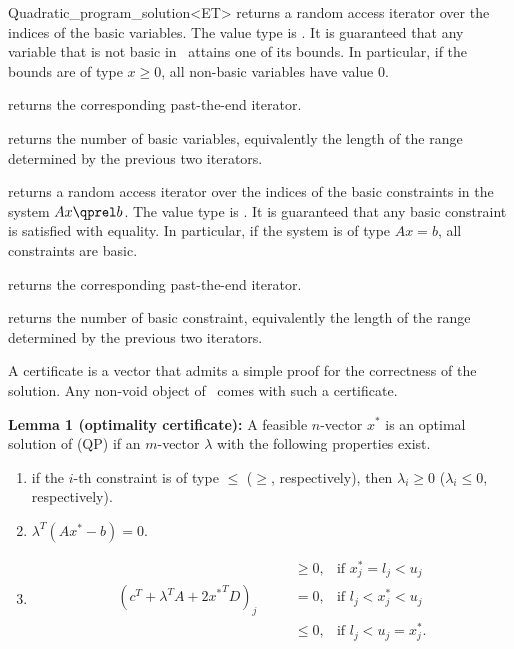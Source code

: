 \begin{ccRefClass}{Quadratic_program_solution<ET>}
{returns a random access iterator over the indices of the basic
variables. The value type is . It is guaranteed that any 
variable that is not basic in \ccVar\ attains one of its bounds. 
In particular, if the bounds are of type $x\geq 0$, all non-basic 
variables have value $0$.}

{returns the corresponding past-the-end iterator.}

{returns the number of basic variables, equivalently the length
of the range determined by the previous two iterators.}

\ccExample
{}

{returns a random access iterator over the indices of the basic
constraints in the system $Ax\qprel b$. The value type is . 
It is guaranteed that any basic constraint is satisfied with equality.
In particular, if the system is of type $Ax=b$, all constraints are
basic.}

{returns the corresponding past-the-end iterator.}

{returns the number of basic constraint, equivalently the length
of the range determined by the previous two iterators.}

\ccExample
{}

\begin{ccAdvanced}

A certificate is a vector that admits a simple proof for the 
correctness of the solution. Any non-void object of \ccRefName\ 
comes with such a certificate.

{\bf Lemma 1 (optimality certificate):} A feasible $n$-vector $x^*$ 
is an optimal solution of (QP) if an $m$-vector $\lambda$ with the
following properties exist.
\begin{enumerate}
\item if the $i$-th constraint is of type $\leq$ ($\geq$, respectively), 
then $\lambda_i\geq 0$ ($\lambda_i\leq 0$, respectively).
\item $\lambda^T(Ax^*-b) = 0$.
\item \[
\begin{array}{llll}
&&\geq 0, & \mbox{if $x^*_j = l_j < u_j$} \\
(c^T + \lambda^T A + 2{x^*}^TD)_j& \quad  &= 0, & \mbox{if $l_j < x^*_j < u_j$} \\
&&\leq 0, & \mbox{if $l_j < u_j = x^*_j$.}
\end{array}\]
\end{enumerate}


\end{ccAdvanced}
\end{ccRefClass}
